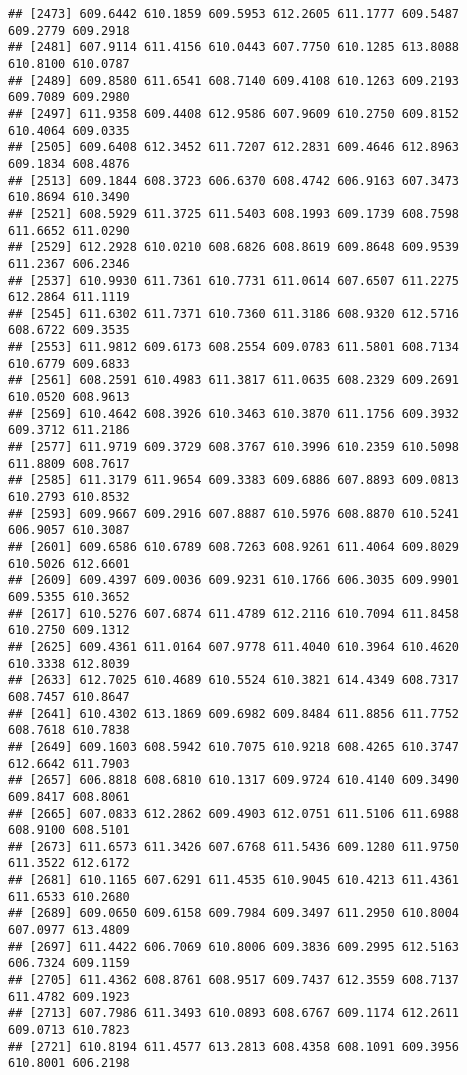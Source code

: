 \documentclass[
]{article}
\begin{document}
\begin{verbatim}
## [2473] 609.6442 610.1859 609.5953 612.2605 611.1777 609.5487 609.2779 609.2918
## [2481] 607.9114 611.4156 610.0443 607.7750 610.1285 613.8088 610.8100 610.0787
## [2489] 609.8580 611.6541 608.7140 609.4108 610.1263 609.2193 609.7089 609.2980
## [2497] 611.9358 609.4408 612.9586 607.9609 610.2750 609.8152 610.4064 609.0335
## [2505] 609.6408 612.3452 611.7207 612.2831 609.4646 612.8963 609.1834 608.4876
## [2513] 609.1844 608.3723 606.6370 608.4742 606.9163 607.3473 610.8694 610.3490
## [2521] 608.5929 611.3725 611.5403 608.1993 609.1739 608.7598 611.6652 611.0290
## [2529] 612.2928 610.0210 608.6826 608.8619 609.8648 609.9539 611.2367 606.2346
## [2537] 610.9930 611.7361 610.7731 611.0614 607.6507 611.2275 612.2864 611.1119
## [2545] 611.6302 611.7371 610.7360 611.3186 608.9320 612.5716 608.6722 609.3535
## [2553] 611.9812 609.6173 608.2554 609.0783 611.5801 608.7134 610.6779 609.6833
## [2561] 608.2591 610.4983 611.3817 611.0635 608.2329 609.2691 610.0520 608.9613
## [2569] 610.4642 608.3926 610.3463 610.3870 611.1756 609.3932 609.3712 611.2186
## [2577] 611.9719 609.3729 608.3767 610.3996 610.2359 610.5098 611.8809 608.7617
## [2585] 611.3179 611.9654 609.3383 609.6886 607.8893 609.0813 610.2793 610.8532
## [2593] 609.9667 609.2916 607.8887 610.5976 608.8870 610.5241 606.9057 610.3087
## [2601] 609.6586 610.6789 608.7263 608.9261 611.4064 609.8029 610.5026 612.6601
## [2609] 609.4397 609.0036 609.9231 610.1766 606.3035 609.9901 609.5355 610.3652
## [2617] 610.5276 607.6874 611.4789 612.2116 610.7094 611.8458 610.2750 609.1312
## [2625] 609.4361 611.0164 607.9778 611.4040 610.3964 610.4620 610.3338 612.8039
## [2633] 612.7025 610.4689 610.5524 610.3821 614.4349 608.7317 608.7457 610.8647
## [2641] 610.4302 613.1869 609.6982 609.8484 611.8856 611.7752 608.7618 610.7838
## [2649] 609.1603 608.5942 610.7075 610.9218 608.4265 610.3747 612.6642 611.7903
## [2657] 606.8818 608.6810 610.1317 609.9724 610.4140 609.3490 609.8417 608.8061
## [2665] 607.0833 612.2862 609.4903 612.0751 611.5106 611.6988 608.9100 608.5101
## [2673] 611.6573 611.3426 607.6768 611.5436 609.1280 611.9750 611.3522 612.6172
## [2681] 610.1165 607.6291 611.4535 610.9045 610.4213 611.4361 611.6533 610.2680
## [2689] 609.0650 609.6158 609.7984 609.3497 611.2950 610.8004 607.0977 613.4809
## [2697] 611.4422 606.7069 610.8006 609.3836 609.2995 612.5163 606.7324 609.1159
## [2705] 611.4362 608.8761 608.9517 609.7437 612.3559 608.7137 611.4782 609.1923
## [2713] 607.7986 611.3493 610.0893 608.6767 609.1174 612.2611 609.0713 610.7823
## [2721] 610.8194 611.4577 613.2813 608.4358 608.1091 609.3956 610.8001 606.2198

\end{verbatim}
\end{document}
